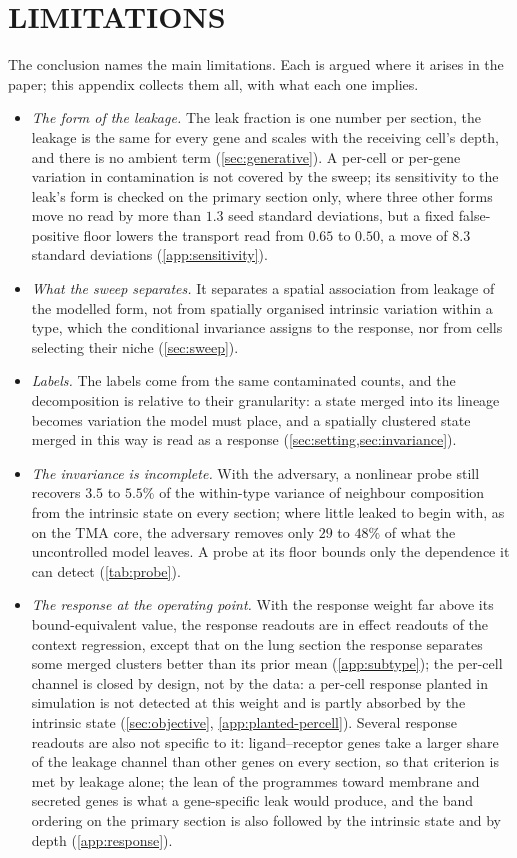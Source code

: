 \section{LIMITATIONS}
\label{app:limitations}

The conclusion names the main limitations. Each is argued where it arises in the paper; this appendix collects them all, with what each one implies.
\begin{itemize}
\item \emph{The form of the leakage.} The leak fraction is one number per section, the leakage is the same for every gene and scales with the receiving cell's depth, and there is no ambient term (\cref{sec:generative}). A per-cell or per-gene variation in contamination is not covered by the sweep; its sensitivity to the leak's form is checked on the primary section only, where three other forms move no read by more than $1.3$ seed standard deviations, but a fixed false-positive floor lowers the transport read from $0.65$ to $0.50$, a move of $8.3$ standard deviations (\cref{app:sensitivity}).
\item \emph{What the sweep separates.} It separates a spatial association from leakage of the modelled form, not from spatially organised intrinsic variation within a type, which the conditional invariance assigns to the response, nor from cells selecting their niche (\cref{sec:sweep}).
\item \emph{Labels.} The labels come from the same contaminated counts, and the decomposition is relative to their granularity: a state merged into its lineage becomes variation the model must place, and a spatially clustered state merged in this way is read as a response (\cref{sec:setting,sec:invariance}).
\item \emph{The invariance is incomplete.} With the adversary, a nonlinear probe still recovers $3.5$ to $5.5\%$ of the within-type variance of neighbour composition from the intrinsic state on every section; where little leaked to begin with, as on the TMA core, the adversary removes only $29$ to $48\%$ of what the uncontrolled model leaves. A probe at its floor bounds only the dependence it can detect (\cref{tab:probe}).
\item \emph{The response at the operating point.} With the response weight far above its bound-equivalent value, the response readouts are in effect readouts of the context regression, except that on the lung section the response separates some merged clusters better than its prior mean (\cref{app:subtype}); the per-cell channel is closed by design, not by the data: a per-cell response planted in simulation is not detected at this weight and is partly absorbed by the intrinsic state (\cref{sec:objective}, \cref{app:planted-percell}). Several response readouts are also not specific to it: ligand--receptor genes take a larger share of the leakage channel than other genes on every section, so that criterion is met by leakage alone; the lean of the programmes toward membrane and secreted genes is what a gene-specific leak would produce, and the band ordering on the primary section is also followed by the intrinsic state and by depth (\cref{app:response}).

\end{itemize}
